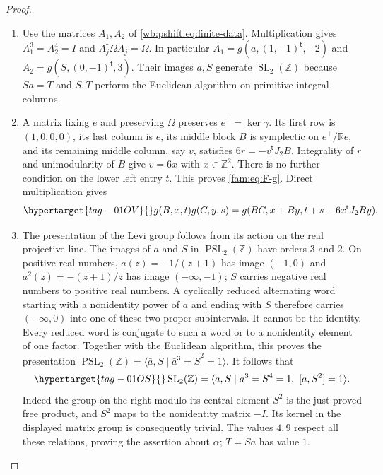 \begin{proof}
\begin{enumerate}[label=\arabic*.,leftmargin=*]
\item Use the matrices $A_1,A_2$ of \eqref{wb:pshift:eq:finite-data}.
Multiplication gives $A_1^3=A_2^4=I$ and
$A_j^{\mathsf t}\Omega A_j=\Omega$.  In particular
$A_1=g(a,(1,-1)^{\mathsf t},-2)$ and
$A_2=g(S,(0,-1)^{\mathsf t},3)$.  Their images $a,S$ generate
$\operatorname{SL}_2(\mathbb Z)$ because $Sa=T$ and $S,T$ perform the
Euclidean algorithm on primitive integral columns.

\item A matrix fixing $e$ and preserving $\Omega$ preserves
$e^{\perp}=\ker\gamma$.  Its first row is $(1,0,0,0)$, its last column is
$e$, its middle block $B$ is symplectic on
$e^{\perp}/\mathbb Re$, and its remaining middle column, say $v$, satisfies
$6r=-v^{\mathsf t}J_2B$.  Integrality of $r$ and unimodularity of $B$
give $v=6x$ with $x\in\mathbb Z^2$.  There is no further condition on
the lower left entry $t$.  This proves \eqref{fam:eq:F-g}.  Direct multiplication
gives
\begin{equation}\hypertarget{tag-01OV}{}\label{fam:eq:F-law}
 g(B,x,t)g(C,y,s)
 =g(BC,x+By,t+s-6x^{\mathsf t}J_2By).
\end{equation}

\item The presentation of the Levi group follows from its action on the
real projective line.  The images of $a$
and $S$ in $\operatorname{PSL}_2(\mathbb Z)$ have orders $3$ and $2$.
On positive real numbers, $a(z)=-1/(z+1)$ has image $(-1,0)$ and
$a^2(z)=-(z+1)/z$ has image $(-\infty,-1)$; $S$ carries negative real
numbers to positive real numbers.  A cyclically reduced alternating word
starting with a nonidentity power of $a$ and ending with $S$ therefore
carries $(-\infty,0)$ into one of these two proper subintervals.  It cannot
be the identity.  Every reduced word is conjugate to such a word or to a
nonidentity element of one factor.  Together with the Euclidean algorithm,
this proves the presentation
$\operatorname{PSL}_2(\mathbb Z)=\langle\bar a,\bar S\mid
\bar a^3=\bar S^2=1\rangle$.  It follows that
\begin{equation}\hypertarget{tag-01OS}{}\label{fam:eq:F-SLpresentation}
 \operatorname{SL}_2(\mathbb Z)=
 \langle a,S\mid a^3=S^4=1,\ [a,S^2]=1\rangle.
\end{equation}
Indeed the group on the right modulo its central element $S^2$ is the
just-proved free product, and $S^2$ maps to the nonidentity matrix $-I$.
Its kernel in the displayed matrix group is consequently trivial.
The values $4,9$ respect all these relations, proving the assertion about
$\alpha$; $T=Sa$ has value $1$.


\end{enumerate}
\end{proof}
